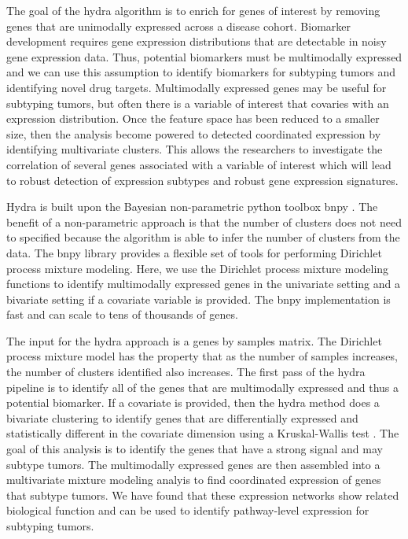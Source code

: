 \documentclass[fleqn,10pt]{wlscirep}
\begin{document}
The goal of the hydra algorithm is to enrich for genes of interest by removing genes that are unimodally expressed across a disease cohort. Biomarker development requires gene expression distributions that are detectable in noisy gene expression data. Thus, potential biomarkers must be multimodally expressed and we can use this assumption to identify biomarkers for subtyping tumors and identifying novel drug targets. Multimodally expressed genes may be useful for subtyping tumors, but often there is a variable of interest that covaries with an expression distribution. Once the feature space has been reduced to a smaller size, then the analysis become powered to detected coordinated expression by identifying multivariate clusters. This allows the researchers to investigate the correlation of several genes associated with a variable of interest which will lead to robust detection of expression subtypes and robust gene expression signatures.

Hydra is built upon the Bayesian non-parametric python toolbox bnpy \cite{hughes2014bnpy}. The benefit of a non-parametric approach is that the number of clusters does not need to specified because the algorithm is able to infer the number of clusters from the data. The bnpy library provides a flexible set of tools for performing Dirichlet process mixture modeling. Here, we use the Dirichlet process mixture modeling functions to identify multimodally expressed genes in the univariate setting and a bivariate setting if a covariate variable is provided. The bnpy implementation is fast and can scale to tens of thousands of genes.

The input for the hydra approach is a genes by samples matrix. The Dirichlet process mixture model has the property that as the number of samples increases, the number of clusters identified also increases. The first pass of the hydra pipeline is to identify all of the genes that are multimodally expressed and thus a potential biomarker. If a covariate is provided, then the hydra method does a bivariate clustering to identify genes that are differentially expressed and statistically different in the covariate dimension using a Kruskal-Wallis test \cite{mckight2010kruskal}. The goal of this analysis is to identify the genes that have a strong signal and may subtype tumors. The multimodally expressed genes are then assembled into a multivariate mixture modeling analyis to find coordinated expression of genes that subtype tumors. We have found that these expression networks show related biological function and can be used to identify pathway-level expression for subtyping tumors.
\end{document}
